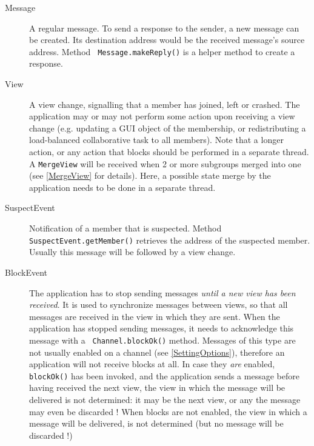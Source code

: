     \begin{description}

    \item[Message] A regular message. To send a response to the sender, a new
	           message can be created. Its destination address would be the
	           received message's source address. Method {\tt
	           Message.makeReply()} is a helper method to create a response.

    \item[View] A view change, signalling that a member has joined, left or
	        crashed. The application may or may not perform some action upon
	        receiving a view change (e.g. updating a GUI object of the
	        membership, or redistributing a load-balanced collaborative task
	        to all members). Note that a longer action, or any action that
	        blocks should be performed in a separate thread.
		A {\tt MergeView} will be received when 2 or more subgroups merged
	        into one (see \ref{MergeView} for details). Here, a possible state
	        merge by the application needs to be done in a separate thread.

    \item[SuspectEvent] Notification of a member that is suspected. Method {\tt
	                SuspectEvent.getMember()} retrieves the address of the
	                suspected member. Usually this message will be followed
	                by a view change.

    \item[BlockEvent] The application has to stop sending messages {\em until a new
	              view has been received}. It is used to synchronize messages
	              between views, so that all messages are received in the view in
	              which they are sent. When the application has stopped sending
	              messages, it needs to acknowledge this message with a {\tt
	              Channel.blockOk()} method. Messages of this type are not
	              usually enabled on a channel (see \ref{SettingOptions}),
	              therefore an application will not receive blocks at all. In
	              case they {\em are} enabled, {\tt blockOk()} has been invoked,
	              and the application sends a message before having received the
	              next view, the view in which the message will be delivered is
	              not determined: it may be the next view, or any the message may
	              even be discarded ! When blocks are not enabled, the view in
	              which a message will be delivered, is not determined (but no
	              message will be discarded !)


\end{description}
